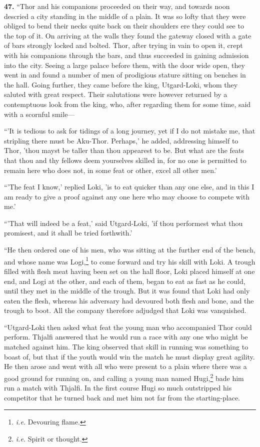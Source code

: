 \textbf{47.} ``Thor and his companions proceeded on their way, and towards
noon descried a city standing in the middle of a plain. It was so
lofty that they were obliged to bend their necks quite back on their
shoulders ere they could see to the top of it. On arriving at the
walls they found the gateway closed with a gate of bars strongly
locked and bolted. Thor, after trying in vain to open it, crept with
his companions through the bars, and thus succeeded in gaining
admission into the city. Seeing a large palace before them, with the
door wide open, they went in and found a number of men of prodigious
stature sitting on benches in the hall. Going further, they came
before the king, Utgard-Loki, whom they saluted with great respect.
Their salutations were however returned by a contemptuous look from
the king, who, after regarding them for some time, said with a
scornful smile—

``'It is tedious to ask for tidings of a long journey, yet if I do not
mistake me, that stripling there must be Aku-Thor. Perhaps,' he added,
addressing himself to Thor, 'thou mayst be taller than thou appearest
to be. But what are the feats that thou and thy fellows deem
yourselves skilled in, for no one is permitted to remain here who does
not, in some feat or other, excel all other men.'

``'The feat I know,' replied Loki, 'is to eat quicker than any one
else, and in this I am ready to give a proof against any one here who
may choose to compete with me.'

``'That will indeed be a feat,' said Utgard-Loki, 'if thou performest
what thou promisest, and it shall be tried forthwith.'

``He then ordered one of his men, who was sitting at the further end of
the bench, and whose name was Logi,\footnote{\emph{i.e.} Devouring flame.} to come forward and try his
skill with Loki. A trough filled with flesh meat having been set on
the hall floor, Loki placed himself at one end, and Logi at the other,
and each of them, began to eat as fast as he could, until they met in
the middle of the trough. But it was found that Loki had only eaten
the flesh, whereas his adversary had devoured both flesh and bone, and
the trough to boot. All the company therefore adjudged that Loki was
vanquished.

``Utgard-Loki then asked what feat the young man who accompanied Thor
could perform. Thjalfi answered that he would run a race with any one
who might be matched against him. The king observed that skill in
running was something to boast of, but that if the youth would win the
match he must display great agility. He then arose and went with all
who were present to a plain where there was a good ground for running
on, and calling a young man named Hugi,\footnote{\emph{i.e.} Spirit or thought.} bade him run a match with
Thjalfi. In the first course Hugi so much outstripped his competitor
that he turned back and met him not far from the starting-place.

